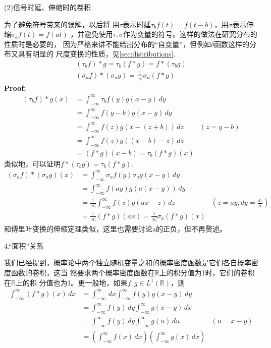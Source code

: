 \documentclass{ctexbook}
\begin{document}
\noindent (2)信号时延、伸缩时的卷积

为了避免符号带来的误解，以后将
用$\tau$表示时延$\tau_b f(t)=f(t-b)$，用$\sigma$表示伸缩$\sigma_a f(t)=f(at)$
，并避免使用$\tau,\sigma$作为变量的符号。这样的做法在研究分布的性质时是必要的，
因为严格来讲不能给出分布的“自变量”，但例如$\delta$函数这样的分布又具有明显的
尺度变换的性质，见\ref{sec:distributions}.
\begin{align*}
    (\tau_b f)*g=\tau_b (f*g)=f*(\tau_b g) \\
    (\sigma_a f)*(\sigma_a g)=\frac{1}{|a|}\sigma_a(f*g)
\end{align*}
\textbf{Proof:}
\begin{align*}
    (\tau_b f)*g(x) & =\int_{-\infty}^{\infty}\tau_b f(y)g(x-y)\,dy           \\
                    & =\int_{-\infty}^{\infty}f(y-b)g(x-y)\,dy                \\
                    & =\int_{-\infty}^{\infty}f(z)g(x-(z+b))\,dz    & (z=y-b) \\
                    & =\int_{-\infty}^{\infty}f(z)g((x-b)-z)\,dz              \\
                    & =(f*g)(x-b)=\tau_b (f*g)(x)
\end{align*}
类似地，可以证明$f*(\tau_b g)=\tau_b (f*g)$.
\begin{align*}
    (\sigma_a f)*(\sigma_a g)(x) & =\int_{-\infty}^{\infty}\sigma_a f(y)\sigma_a g(x-y)\,dy                          \\
                                 & =\int_{-\infty}^{\infty}f(ay)g(a(x-y))\,dy                                        \\
                                 & =\frac{1}{|a|}\int_{-\infty}^{\infty}f(z)g(a x - z)\,dz  & (z=ay,dy=\frac{dz}{a}) \\
                                 & =\frac{1}{|a|}(f*g)(a x)=\frac{1}{|a|}\sigma_a(f*g)(x)
\end{align*}
和傅里叶变换的伸缩定理类似，这里也需要讨论a的正负，但不再赘述。

4.“面积”关系

我们已经提到，概率论中两个独立随机变量之和的概率密度函数是它们各自概率密度函数的卷积，这当
然要求两个概率密度函数在$\mathbb{R}$上的积分值为1时，它们的卷积在$\mathbb{R}$上的积
分值也为1。更一般地，如果$f,g\in L^1(\mathbb{R})$，则
\begin{align*}
    \int_{-\infty}^{\infty}(f*g)(x)\,dx & =\int_{-\infty}^{\infty}\,dx\int_{-\infty}^{\infty}f(y)g(x-y)\,dy                                   \\
                                        & =\int_{-\infty}^{\infty}f(y)\,dy\int_{-\infty}^{\infty}g(x-y)\,dx                                   \\
                                        & =\int_{-\infty}^{\infty}f(y)\,dy\int_{-\infty}^{\infty}g(u)\,du                           & (u=x-y) \\
                                        & =\left(\int_{-\infty}^{\infty}f(x)\,dx\right)\left(\int_{-\infty}^{\infty}g(x)\,dx\right)
\end{align*}
\end{document}
